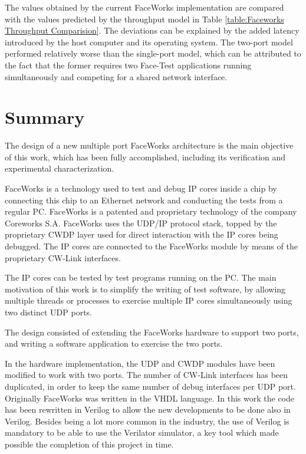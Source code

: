 \documentclass[defaultstyle,10pt,master,Helvetica]{thesis}
\begin{document}
The values obtained by the current FaceWorks implementation are compared with the values predicted by the throughput model in Table \ref{table:Faceworks Throughput Comparision}. The deviations can be explained by the added latency introduced by the host computer and its operating system. The two-port model performed relatively worse than the single-port model, which can be attributed to the fact that the former requires two Face-Test applications running simultaneously and competing for a shared network interface.


 


\section{Summary}

The design of a new multiple port FaceWorks architecture is the main objective of this work, which has been fully accomplished, including its verification and experimental characterization. 

FaceWorks is a technology used to test and debug IP cores inside a chip by connecting this chip to an Ethernet network and conducting the tests from a regular \ac{PC}. FaceWorks is a patented and proprietary technology of the company Coreworks S.A. FaceWorks uses the UDP/IP protocol stack, topped by the proprietary CWDP layer used for direct interaction with the IP cores being debugged. The IP cores are connected to the FaceWorks module by means of the proprietary CW-Link interfaces.

The IP cores can be tested by test programs running on the PC. The main motivation of this work is to simplify the writing of test software, by allowing multiple threads or processes to exercise multiple IP cores simultaneously using two distinct UDP ports.

The design consisted of extending the FaceWorks hardware to support two ports, and writing a software application to exercise the two ports.

In the hardware implementation, the UDP and CWDP modules have been modified to work with two ports. The number of CW-Link interfaces has been duplicated, in order to keep the same number of debug interfaces per UDP port. Originally FaceWorks was written in the \ac{VHDL} language. In this work the code has been  rewritten in Verilog to allow the new developments to be done also in Verilog. Besides being a lot more common in the industry, the use of Verilog is mandatory to be able to use the Verilator simulator, a key tool which made possible the completion of this project in time.
\end{document}
